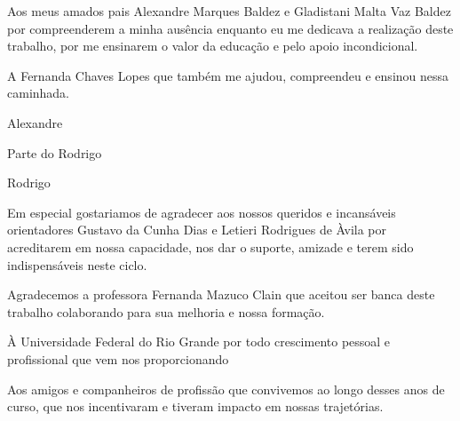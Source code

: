 Aos meus amados pais Alexandre Marques Baldez e Gladistani Malta Vaz Baldez
por compreenderem a minha ausência enquanto eu me dedicava a realização deste trabalho,
por me ensinarem o valor da educação e pelo apoio incondicional.

A Fernanda Chaves Lopes que também me ajudou, compreendeu e ensinou nessa caminhada.

\begin{flushright}Alexandre\end{flushright}

Parte do Rodrigo

\begin{flushright}Rodrigo\end{flushright}
    
Em especial gostariamos de agradecer aos nossos queridos e incansáveis orientadores
Gustavo da Cunha Dias e Letieri Rodrigues de Àvila por acreditarem em nossa capacidade,
nos dar o suporte, amizade e terem sido indispensáveis neste ciclo.

Agradecemos a professora Fernanda Mazuco Clain que aceitou ser banca deste trabalho colaborando
para sua melhoria e nossa formação.

À Universidade Federal do Rio Grande por todo crescimento pessoal e profissional 
que vem nos proporcionando

Aos amigos e companheiros de profissão que convivemos ao longo desses anos de curso, que nos incentivaram
e tiveram impacto em nossas trajetórias.
